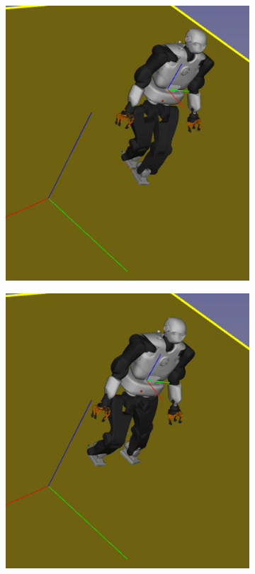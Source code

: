 \begin{figure}[h]
\begin{subfigure}[t]{0.19\linewidth}
    \end{subfigure}
    \begin{subfigure}[t]{0.19\linewidth}
        \includegraphics[width=\textwidth,trim={3cm 3cm 0 0}, clip] {Figures/Chapter_CPSB/sidewalk_seq/frame_3.png}
    \end{subfigure}
    \begin{subfigure}[t]{0.19\linewidth}
        \includegraphics[width=\textwidth,trim={3cm 3cm 0 0}, clip] {Figures/Chapter_CPSB/sidewalk_seq/frame_5.png}

\end{subfigure}
\end{figure}
